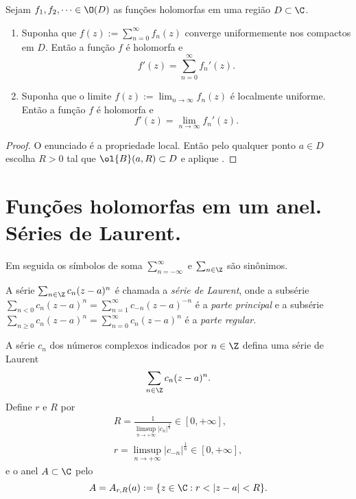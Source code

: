 \begin{teorema}[Weierstrass]
\label{t:weierstrass}
Sejam $f_1,f_2,\dots \in \O(D)$ as funções holomorfas em uma região $D\subset \C$.
\begin{enumerate}
\item
Suponha que $f(z) := \sum_{n=0}^\infty f_n(z)$ converge uniformemente
nos compactos em $D$. Então a função $f$ é holomorfa e
\[ f'(z) = \sum_{n=0}^\infty f_n'(z). \]
\item
Suponha que o limite $f(z) := \lim_{n\to\infty} f_n(z)$ é localmente uniforme.
Então a função $f$ é holomorfa e
\[ f'(z) = \lim_{n\to\infty} f_n'(z). \]
\end{enumerate}
\end{teorema}
\begin{proof}
O enunciado é a propriedade local.
Então pelo qualquer ponto $a\in D$ escolha $R>0$ tal que $\ol{B}(a,R) \subset D$
e aplique .
\end{proof}

\section{Funções holomorfas em um anel. Séries de Laurent.}

Em seguida os símbolos de soma $\sum_{n=-\infty}^\infty$
e $\sum_{n\in\Z}$ são sinônimos.

\begin{defin}
A série $\sum_{n\in\Z} c_n (z-a)^n$ é chamada
a \emph{série de Laurent},
onde a subsérie $\sum_{n<0} c_n (z-a)^n = \sum_{n=1}^\infty c_{-n} (z-a)^{-n}$
é a \emph{parte principal}
e a subsérie $\sum_{n\geq 0} c_n (z-a)^n = \sum_{n=0}^\infty c_n (z-a)^n$
é a \emph{parte regular}.
\end{defin}

A série $c_n$ dos números complexos indicados por $n\in\Z$
defina uma série de Laurent
\[ \sum_{n\in\Z} c_n (z-a)^n. \]
Define $r$ e $R$ por
\begin{align*}
R = \frac1{\limsup_{n\to+\infty} |c_n|^{\frac1n}} \in [0,+\infty], \\
r = \limsup_{n\to+\infty} |c_{-n}|^{\frac1n} \in [0,+\infty],
\end{align*}
e o anel $A\subset \C$ pelo
\[ A = A_{r,R}(a) := \{ z\in\C : r < |z-a| < R \}. \]

